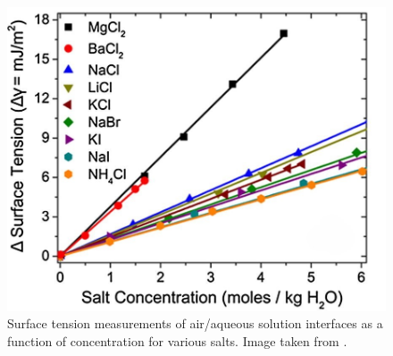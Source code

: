 \begin{figure}[tbhp!]
    \centering
    \includegraphics[width=0.7\linewidth]{images/ST_solute.jpg}
    \caption{Surface tension measurements of air/aqueous solution interfaces as a function of concentration for various salts. Image taken from \cite{okur2017jones}. }
    \label{fig:surf_tens_solute}
\end{figure}